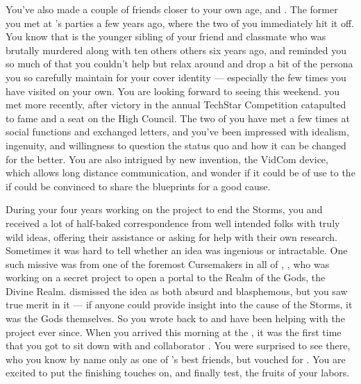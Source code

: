 \documentclass[char]{GL2020}
\begin{document}
You’ve also made a couple of friends closer to your own age, \cHeir{\full} and \cTechStar{\full}. The former you met at \cHeir{\their} \cDiplomat{\auncle} \cDiplomat{}’s parties a few years ago, where the two of you immediately hit it off. You know that \cHeir{} is the younger sibling of your friend and classmate \cHeirSibling{} who was brutally murdered along with ten others others six years ago, and \cHeir{\they} reminded you so much of \cHeirSibling{} that you couldn’t help but relax around \cHeir{\them} and drop a bit of the persona you so carefully maintain for your cover identity — especially the few times you have visited \cHeir{\them} on your own. You are looking forward to seeing \cHeir{} this weekend. \cTechStar{} you met more recently, after \cTechStar{\their} victory in the annual TechStar Competition catapulted \cTechStar{\them} to fame and a seat on the High Council. The two of you have met a few times at social functions and exchanged letters, and you’ve been impressed with \cTechStar{\their} idealism, ingenuity, and willingness to question the status quo and how it can be changed for the better. You are also intrigued by \cTechStar{\their} new invention, the VidCom device, which allows long distance communication, and wonder if it could be of use to the \pShip{} if \cTechStar{} could be convinced to share the blueprints for a good cause.

During your four years working on the project to end the Storms, you and \cHeadScientist{} received a lot of half-baked correspondence from well intended folks with truly wild ideas, offering their assistance or asking for help with their own research. Sometimes it was hard to tell whether an idea was ingenious or intractable. One such missive was from one of the foremost Cursemakers in all of \pEarth{}, \cCurse{\full}, who was working on a secret project to open a portal to the Realm of the Gods, the Divine Realm. \cHeadScientist{} dismissed the idea as both absurd and blasphemous, but you saw true merit in it — if anyone could provide insight into the cause of the Storms, it was the Gods themselves. So you wrote back to \cCurse{} and have been helping with the project ever since. When you arrived this morning at the \pSchool{}, it was the first time that you got to sit down with \cCurse{} and \cCurse{\their} collaborator \cFlowPriest{\full}. You were surprised to see \cAmbition{\full} there, who you know by name only as one of \cHeir{}’s best friends, but \cFlowPriest{} vouched for \cAmbition{\them}. You are excited to put the finishing touches on, and finally test, the fruits of your labors.
\end{document}

